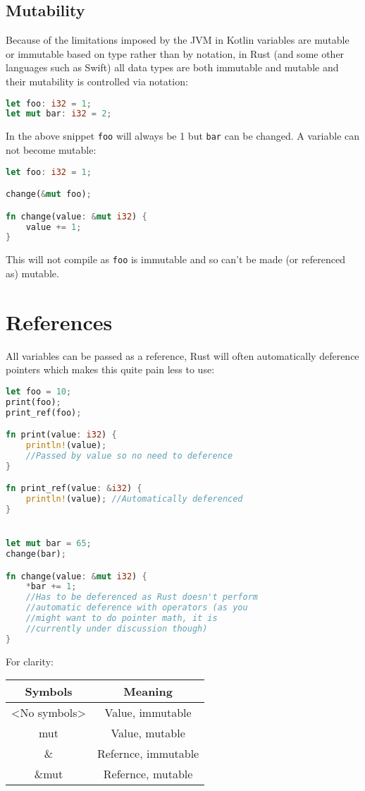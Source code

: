 \documentclass[a4paper,11pt]{article}
\begin{document}
\subsection{Mutability}
Because of the limitations imposed by the JVM in Kotlin variables are mutable or immutable based on type rather than by notation, in Rust (and some other languages such as Swift) all data types are both immutable and mutable and their mutability is controlled via notation:
\begin{lstlisting}[language=Rust,frame=single]
let foo: i32 = 1;
let mut bar: i32 = 2;
\end{lstlisting}
In the above snippet \lstinline{foo} will always be 1 but \lstinline{bar} can be changed. A variable can not become mutable:
\begin{lstlisting}[language=Rust,frame=single]
let foo: i32 = 1;

change(&mut foo);

fn change(value: &mut i32) {
	value += 1;
}
\end{lstlisting}
This will not compile as \lstinline{foo} is immutable and so can't be made (or referenced as) mutable.

\newpage
\section{References}
All variables can be passed as a reference, Rust will often automatically deference pointers which makes this quite pain less to use:
\begin{lstlisting}[language=Rust,frame=single]
let foo = 10;
print(foo);
print_ref(foo);

fn print(value: i32) {
	println!(value); 
	//Passed by value so no need to deference
}

fn print_ref(value: &i32) {
	println!(value); //Automatically deferenced
}


let mut bar = 65;
change(bar);

fn change(value: &mut i32) {
	*bar += 1; 
	//Has to be deferenced as Rust doesn't perform 
	//automatic deference with operators (as you 
	//might want to do pointer math, it is
	//currently under discussion though)
} 

\end{lstlisting}

For clarity:
\begin{center}
\begin{tabular}{ |c|c| } 
 \hline
 Symbols & Meaning \\ 
 \hline
 <No symbols> & Value, immutable \\ 
 mut & Value, mutable \\ 
 \& & Refernce, immutable \\ 
 \&mut & Refernce, mutable \\ 
 \hline
\end{tabular}
\end{center}
\end{document}
